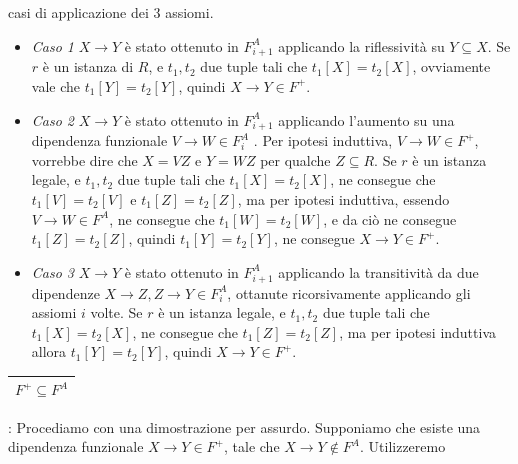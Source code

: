 \documentclass[12pt, letterpaper]{article}
\begin{document}
casi di applicazione dei 3 assiomi. \begin{itemize}
    \item \textit{Caso 1} \(X\rightarrow Y\) è stato ottenuto in \(F_{i+1}^A\) applicando la riflessività su \(Y\subseteq X\). 
    Se \(r\) è un istanza di \(R\), e \(t_1,t_2\) due tuple tali che \(t_1[X]=t_2[X]\), ovviamente 
    vale che \(t_1[Y]=t_2[Y]\), quindi \(X\rightarrow Y\in F^+\).
    \item \textit{Caso 2} \(X\rightarrow Y\) è stato ottenuto in \(F_{i+1}^A\) applicando l'aumento su una dipendenza 
    funzionale \(V\rightarrow W\in F^A_i\) . Per 
    ipotesi induttiva, \(V\rightarrow W\in F^+\), vorrebbe dire che \(X=VZ\) e \(Y=WZ\) per qualche \(Z\subseteq R\).
    Se \(r\) è un istanza legale, e \(t_1,t_2\) due tuple tali che \(t_1[X]=t_2[X]\), ne consegue 
    che \(t_1[V]=t_2[V]\) e  \(t_1[Z]=t_2[Z]\), ma per ipotesi induttiva, essendo \(V\rightarrow W\in F^A\), 
    ne consegue che \(t_1[W]=t_2[W]\), e da ciò ne consegue  \(t_1[Z]=t_2[Z]\), quindi  \(t_1[Y]=t_2[Y]\), ne 
    consegue 
    \(X\rightarrow Y\in F^+\).
    \item \textit{Caso 3} \(X\rightarrow Y\) è stato ottenuto in \(F_{i+1}^A\) applicando la transitività da due 
    dipendenze \(X\rightarrow Z, Z\rightarrow Y \in F^A_i\), ottanute ricorsivamente applicando gli assiomi 
    \(i\) volte. Se \(r\) è un istanza legale, e \(t_1,t_2\) due tuple tali che \(t_1[X]=t_2[X]\), 
    ne consegue che \(t_1[Z]=t_2[Z]\), ma per ipotesi induttiva allora \(t_1[Y]=t_2[Y]\), quindi 
    \(X\rightarrow Y\in F^+\).
\end{itemize}
\begin{tabular}{|c|}\hline \(F^+\subseteq F^A\) \\ \hline\end{tabular}: Procediamo con una dimostrazione per assurdo. 
Supponiamo che esiste una dipendenza funzionale \(X\rightarrow Y \in F^+\), tale che \(X\rightarrow Y \notin F^A\). Utilizzeremo 
\end{document}
